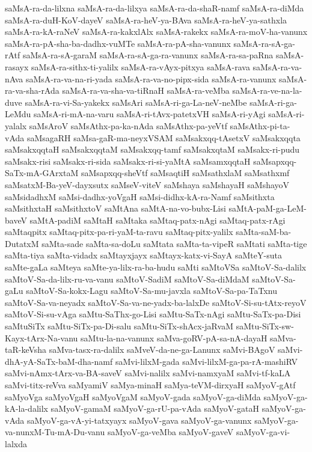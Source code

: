 {saMsA-ra-da-lilxna
saMsA-ra-da-lilxya
saMsA-ra-da-shaR-namf
saMsA-ra-diMda
saMsA-ra-duH-KoV-dayeV
saMsA-ra-heV-ya-BAva
saMsA-ra-heV-ya-sathxla
saMsA-ra-kA-raNeV
saMsA-ra-kakxlAlx
saMsA-rakekx
saMsA-ra-moV-ha-vanunx
saMsA-ra-pA-sha-ba-dadhx-vuMTe
saMsA-ra-pA-sha-vanunx
saMsA-ra-sA-ga-rAtf
saMsA-ra-sA-garaM
saMsA-ra-sA-ga-ra-vanunx
saMsA-ra-sa-paRna
saMsA-rasayx
saMsA-ra-sithx-ti-yalilx
saMsA-ra-vAyx-pitxya
saMsA-rava
saMsA-ra-va-nAva
saMsA-ra-va-na-ri-yada
saMsA-ra-va-no-pipx-sida
saMsA-ra-vanunx
saMsA-ra-va-sha-rAda
saMsA-ra-va-sha-va-tiRnaH
saMsA-ra-veMba
saMsA-ra-ve-na-la-duve
saMsA-ra-vi-Sa-yakekx
saMsAri
saMsA-ri-ga-La-neV-neMbe
saMsA-ri-ga-LeMdu
saMsA-ri-mA-na-varu
saMsA-ri-tAvx-patetxVH
saMsA-ri-yAgi
saMsA-ri-yalalx
saMsAroV
saMsAthx-pa-ka-nAda
saMsAthx-pa-yeVtf
saMsAthx-pi-ta-vAda
saMsagaRH
saMsa-gaR-ma-neyxVSAM
saMsakxqq-tAsetxV
saMsakxqqta
saMsakxqqtaH
saMsakxqqtaM
saMsakxqq-tamf
saMsakxqtaM
saMsakx-ri-pudu
saMsakx-risi
saMsakx-ri-sida
saMsakx-ri-si-yaMtA
saMsamxqqtaH
saMsapxqq-SaTx-mA-GArxtaM
saMsapxqq-sheVtf
saMsaqtiH
saMsathxlaM
saMsathxmf
saMsatxM-Ba-yeV-dayxsutx
saMseV-viteV
saMshaya
saMshayaH
saMshayoV
saMsidadhxM
saMsi-dadhx-yoVgaH
saMsi-didhx-kA-ra-Namf
saMsithxta
saMsithxtaH
saMsithxtoV
saMtAna
saMtA-na-vo-bubx-Lisi
saMtA-paM-ga-LeM-baveV
saMtA-padiM
saMtaH
saMtaka
saMtaq-patx-nAgi
saMtaq-patx-rAgi
saMtaqpitx
saMtaq-pitx-pa-ri-yaM-ta-ravu
saMtaq-pitx-yalilx
saMta-saM-ba-DutatxM
saMta-sade
saMta-sa-doLu
saMtata
saMta-ta-vipeR
saMtati
saMta-tige
saMta-tiya
saMta-vidadx
saMtayxjayx
saMtayx-katx-vi-SayA
saMteY-suta
saMte-gaLa
saMteya
saMte-ya-lilx-ra-ba-hudu
saMti
saMtoVSa
saMtoV-Sa-dalilx
saMtoV-Sa-da-lilx-ru-va-vanu
saMtoV-SadiM
saMtoV-Sa-diMdaM
saMtoV-Sa-gaLu
saMtoV-Sa-kokx-Lagu
saMtoV-Sa-mu-javxla
saMtoV-Sa-pa-TaTxnu
saMtoV-Sa-va-neyadx
saMtoV-Sa-va-ne-yadx-ba-lalxDe
saMtoV-Si-su-tAtx-reyoV
saMtoV-Si-su-vAga
saMtu-SaThx-go-Lisi
saMtu-SaTx-nAgi
saMtu-SaTx-pa-Disi
saMtuSiTx
saMtu-SiTx-pa-Di-salu
saMtu-SiTx-shAcx-jaRvaM
saMtu-SiTx-sw-Kayx-tArx-Na-vanu
saMtu-la-na-vanunx
saMva-goRV-pA-sa-nA-dayaH
saMva-taR-keVsha
saMva-tasx-ra-dalilx
saMveV-da-ne-ga-Lanunx
saMvi-BAgoV
saMvi-dhA-yA-SaTx-baM-dha-namf
saMvi-lilxM-gada
saMvi-lilxM-ga-pa-rA-mashiRV
saMvi-nAmx-tArx-va-BA-saveV
saMvi-nalilx
saMvi-namxyaM
saMvi-tf-kaLA
saMvi-titx-reVva
saMyamiV
saMya-minaH
saMya-teVM-dirxyaH
saMyoV-gAtf
saMyoVga
saMyoVgaH
saMyoVgaM
saMyoV-gada
saMyoV-ga-diMda
saMyoV-ga-kA-la-dalilx
saMyoV-gamaM
saMyoV-ga-rU-pa-vAda
saMyoV-gataH
saMyoV-ga-vAda
saMyoV-ga-vA-yi-tatxyayx
saMyoV-gava
saMyoV-ga-vanunx
saMyoV-ga-va-nunxM-Tu-mA-Du-vanu
saMyoV-ga-veMba
saMyoV-gaveV
saMyoV-ga-vi-lalxda
}
